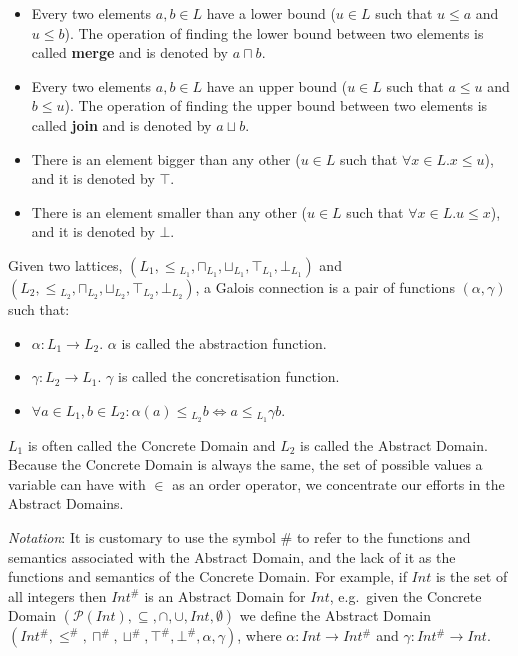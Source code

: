 \begin{itemize}
\tightlist
\item
  Every two elements \(a, b \in L\) have a lower bound (\(u \in L\) such
  that \(u \le a\) and \(u \le b\)). The operation of finding the lower
  bound between two elements is called \textbf{merge} and is denoted by
  \(a \sqcap b\).
\item
  Every two elements \(a, b \in L\) have an upper bound (\(u \in L\)
  such that \(a \le u\) and \(b \le u\)). The operation of finding the
  upper bound between two elements is called \textbf{join} and is
  denoted by \(a \sqcup b\).
\item
  There is an element bigger than any other (\(u \in L\) such that
  \(\forall x \in L . x \le u\)), and it is denoted by \(\top\).
\item
  There is an element smaller than any other (\(u \in L\) such that
  \(\forall x \in L . u \le x\)), and it is denoted by \(\bot\).
\end{itemize}

Given two lattices,
\((L_1, \le{}_{L_1}, \sqcap{}_{L_1}, \sqcup{}_{L_1}, \top{}_{L_1}, \bot{}_{L_1})\)
and
\((L{}_2, \le{}_{L_2}, \sqcap{}_{L_2}, \sqcup{}_{L_2}, \top{}_{L_2}, \bot{}_{L_2})\),
a Galois connection is a pair of functions \((\alpha, \gamma)\) such
that:

\begin{itemize}
\tightlist
\item
  \(\alpha : L_1 \rightarrow L_2\). \(\alpha\) is called the abstraction
  function.
\item
  \(\gamma : L_2 \rightarrow L_1\). \(\gamma\) is called the
  concretisation function.
\item
  \(\forall a \in L_1, b \in L_2 : \alpha(a) \le{}_{L_2} b \iff a \le{}_{L_1} \gamma{b}\).
\end{itemize}

\(L_1\) is often called the Concrete Domain and \(L_2\) is called the
Abstract Domain. Because the Concrete Domain is always the same, the set
of possible values a variable can have with \(\in\) as an order
operator, we concentrate our efforts in the Abstract Domains.

\emph{Notation}: It is customary to use the symbol \(\#\) to refer to
the functions and semantics associated with the Abstract Domain, and the
lack of it as the functions and semantics of the Concrete Domain. For
example, if \(Int\) is the set of all integers then \(Int^{\#}\) is an
Abstract Domain for \(Int\), e.g.~given the Concrete Domain
\((\mathcal{P}(Int), \subseteq, \cap, \cup, Int, \emptyset)\) we define
the Abstract Domain
\((Int^{\#}, \le^{\#}, \sqcap^{\#}, \sqcup^{\#}, \top^{\#}, \bot^{\#}, \alpha, \gamma)\),
where \(\alpha : Int \rightarrow Int^{\#}\) and
\(\gamma : Int^{\#} \rightarrow Int\).

